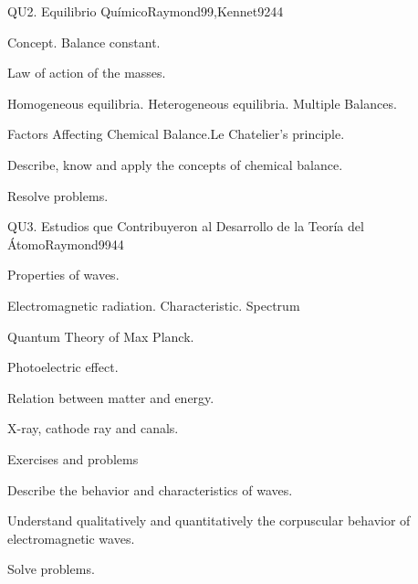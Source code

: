 \begin{syllabus}
\begin{unit}{}{QU2. Equilibrio Químico}{Raymond99,Kennet92}{4}{4}
\begin{topics}
      \item Concept. Balance constant.
      \item Law of action of the masses.
      \item Homogeneous equilibria. Heterogeneous equilibria. Multiple Balances.
      \item Factors Affecting Chemical Balance.Le Chatelier's principle.
    \end{topics}

   \begin{learningoutcomes}
      \item Describe, know and apply the concepts of chemical balance.
      \item Resolve problems.
   \end{learningoutcomes}
\end{unit}

\begin{unit}{}{QU3. Estudios que Contribuyeron al Desarrollo de la Teoría del Átomo}{Raymond99}{4}{4}
\begin{topics}
      \item Properties of waves.
      \item Electromagnetic radiation. Characteristic. Spectrum
      \item Quantum Theory of Max Planck.
      \item Photoelectric effect.
      \item Relation between matter and energy.
      \item X-ray, cathode ray and canals.
      \item Exercises and problems
\end{topics}

   \begin{learningoutcomes}
      \item Describe the behavior and characteristics of waves.
      \item Understand qualitatively and quantitatively the corpuscular behavior of electromagnetic waves.
      \item Solve problems.
   \end{learningoutcomes}
\end{unit}


\end{syllabus}
